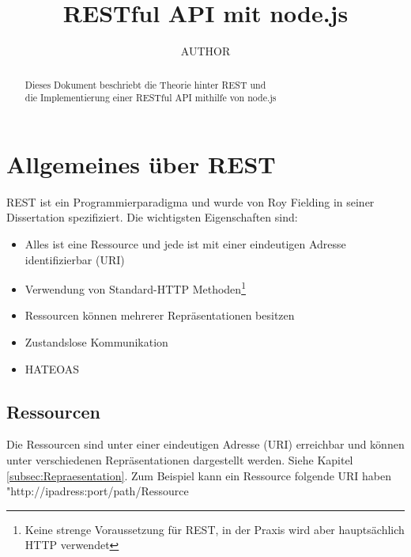 \documentclass[listof=totoc]{article}
\title{RESTful API mit node.js}
\author{AUTHOR}
\begin{document}
	\maketitle
	\begin{abstract}
		\begin{center}
			Dieses Dokument beschriebt die Theorie hinter \ac{REST} und \\
			die Implementierung einer RESTful \ac{API} mithilfe von node.js
		\end{center}
	\end{abstract}
	\newpage
	
	\tableofcontents 
	\lstlistoflistings
	
	\newpage
	
	\section{Allgemeines über \ac{REST}}
	\ac{REST} ist ein Programmierparadigma und wurde von Roy Fielding in seiner Dissertation\cite{REST_THESIS} spezifiziert.
	\newline \newline
	Die wichtigsten Eigenschaften\cite[p.~2]{RESTBOOK} sind:
	\begin{itemize}  
		\item Alles ist eine Ressource und jede ist mit einer eindeutigen Adresse identifizierbar (\ac{URI})
		\item Verwendung von Standard-\ac{HTTP} Methoden\footnote{Keine strenge Voraussetzung für \ac{REST}, in der Praxis wird aber hauptsächlich \ac{HTTP} verwendet}
		\item Ressourcen können mehrerer Repräsentationen besitzen
		\item Zustandslose Kommunikation
		\item  \ac{HATEOAS}
	\end{itemize}
	\subsection{Ressourcen}
	Die Ressourcen sind unter einer eindeutigen Adresse (\ac{URI}) erreichbar und können unter verschiedenen Repräsentationen dargestellt werden. Siehe Kapitel \ref{subsec:Repraesentation}.
	\newline \newline
	Zum Beispiel kann ein Ressource folgende \ac{URI} haben "http://ipadress:port/path/Ressource
\end{document}

